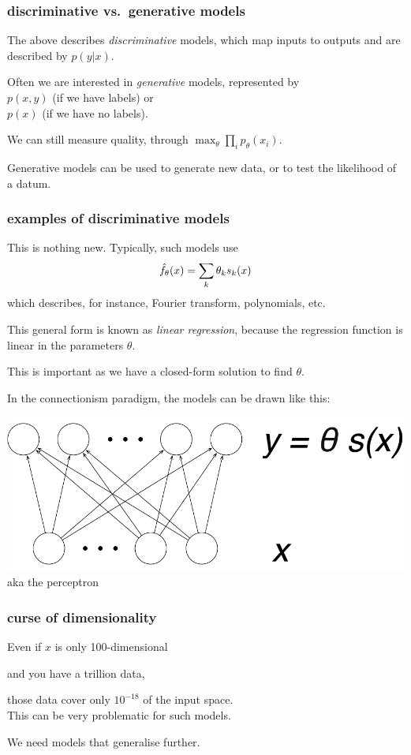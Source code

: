 \documentclass[USenglish,pdftex,compress,10pt,svgnamesi]{beamer}%
\begin{document}
\begin{frame}
\frametitle{discriminative vs.\ generative models}

The above describes \textit{discriminative} models, which map inputs to outputs and are described by $p(y|x)$.

Often we are interested in \textit{generative} models, represented by \\
$p(x, y)$ (if we have labels) or \\
$p(x)$ (if we have no labels). 


We can still measure quality, through $\max_\theta \prod_i p_\theta (x_i)$.

Generative models can be used to generate new data, or to test the likelihood of a datum.

\end{frame}



\begin{frame}
\frametitle{examples of discriminative models}

This is nothing new. Typically, such models use
$$\hat{f}_\theta(x) = \sum_k \theta_k s_k (x)$$
which describes, for instance, Fourier transform, polynomials, etc.

This general form is known as \textit{linear regression}, because the regression function is linear in the parameters $\theta$.

This is important as we have a closed-form solution to find $\theta$.

In the connectionism paradigm, the models can be drawn like this:

\includegraphics[scale=0.3]{nn0.pdf}
aka the perceptron
\end{frame}

\begin{frame}
\frametitle{curse of dimensionality}

Even if $x$ is only 100-dimensional

and you have a trillion data, 

\quad those data cover only $10^{-18}$ of the input space.\\[3ex]

This can be very problematic for such models.  

We need models that generalise further.
\end{frame}
\end{document}
